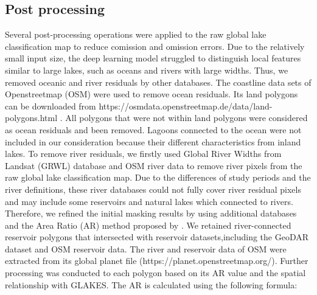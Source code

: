 \documentclass[preprint,12pt,authoryear]{elsarticle}
\begin{document}
\subsection{Post processing}
\label{subsec4}

Several post-processing operations were applied to the raw global lake classification map to reduce comission and omission errors. Due to the relatively small input size, the deep learning model struggled to distinguish local features similar to large lakes, such as oceans and rivers with large widths. Thus, we removed oceanic and river residuals by other databases. The coastline data sets of Openstreetmap (OSM) \citep{goodchild_citizens_2007} were used to remove ocean residuals. Its land polygons can be downloaded from https://osmdata.openstreetmap.de/data/land-polygons.html . All polygons that were not within land polygons were considered as ocean residuals and been removed. Lagoons connected to the ocean were not included in our consideration because their different characteristics from inland lakes. To remove river residuals, we firstly used   Global River Widths from Landsat (GRWL) \citep{allen_global_2018} database and OSM river data to remove river pixels from the raw global lake classification map. Due to the differences of study periods and the river definitions, these river databases could not fully cover river residual pixels and may include some reservoirs and natural lakes which connected to rivers. Therefore, we refined the initial masking results by using additional databases and the Area Ratio (AR) method proposed by \citet{pi_mapping_2022}. We retained river-connected reservoir polygons that intersected with reservoir datasets,including the GeoDAR dataset \citep{wang_surface_2025} and OSM reservoir data. The river and reservoir data of OSM were extracted from its global planet file (https://planet.openstreetmap.org/). Further processing was conducted to each polygon based on its AR value and the spatial relationship with GLAKES. The AR is calculated using the following formula:
\end{document}
